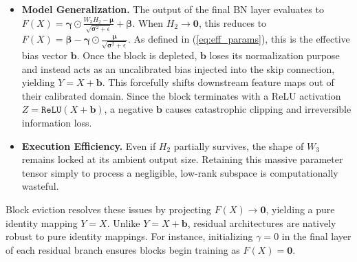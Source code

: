 \documentclass[11pt, a4paper, copyright, gdm]{google}
\newcommand{\bVect}{\boldsymbol{b}}
\newcommand{\zeroVect}{\boldsymbol{0}}
\newcommand{\muVect}{\boldsymbol{\mu}}
\newcommand{\sigmaVect}{\boldsymbol{\sigma}}
\newcommand{\betaVect}{\boldsymbol{\beta}}
\newcommand{\gammaVect}{\boldsymbol{\gamma}}
\newcommand{\ReLU}{\texttt{ReLU}\xspace}
\theoremstyle{definition}
\begin{document}
\begin{itemize}
    \item \textbf{Model Generalization.} The output of the final BN layer evaluates to $F(X) = \gammaVect \odot \frac{W_3 H_2 - \muVect}{\sqrt{\sigmaVect^2 + \epsilon}} + \betaVect$. When $H_2 \to \zeroVect$, this reduces to $F(X) = \betaVect - \gammaVect \odot \frac{\muVect}{\sqrt{\sigmaVect^2 + \epsilon}}$. As defined in (\ref{eq:eff_params}), this is the effective bias vector $\bVect$. Once the block is depleted, $\bVect$ loses its normalization purpose and instead acts as an uncalibrated bias injected into the skip connection, yielding $Y = X + \bVect$. This forcefully shifts downstream feature maps out of their calibrated domain. Since the block terminates with a ReLU activation $Z = \ReLU(X + \bVect)$, a negative $\bVect$ causes catastrophic clipping and irreversible information loss.
    \item \textbf{Execution Efficiency.} Even if $H_2$ partially survives, the shape of $W_3$ remains locked at its ambient output size. Retaining this massive parameter tensor simply to process a negligible, low-rank subspace is computationally wasteful.
\end{itemize}

Block eviction resolves these issues by projecting $F(X) \to \zeroVect$, yielding a pure identity mapping $Y = X$. Unlike $Y = X + \bVect$, residual architectures are natively robust to pure identity mappings. For instance, initializing $\gamma=0$ in the final layer of each residual branch \cite{goyal2017accurate, he2016identity} ensures blocks begin training as $F(X) = \zeroVect$.
\end{document}
